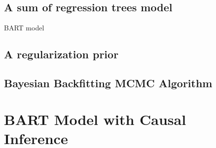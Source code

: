 \subsection{A sum of regression trees model}
BART model 
\subsection{A regularization prior}

\subsection{Bayesian Backfitting MCMC Algorithm}


\section{BART Model with Causal Inference}\label{twoversion}%

